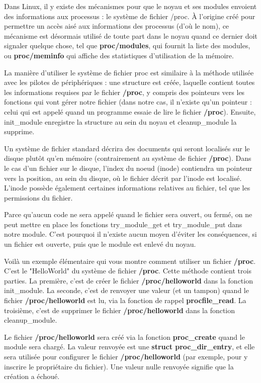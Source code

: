 \documentclass[11pt]{article}
\begin{document}
Dans Linux, il y existe des mécanismes pour que le noyau et ses modules envoient des informations aux processus : le système de fichier /proc. À l'origine créé pour permettre un accès aisé aux informations des processus (d'où le nom), ce mécanisme est désormais utilisé de toute part dans le noyau quand ce dernier doit signaler quelque chose, tel que \textbf{proc/modules}, qui fournit la liste des modules, ou \textbf{proc/meminfo} qui affiche des statistiques d'utilisation de la mémoire.

La manière d'utiliser le système de fichier proc est similaire à la méthode utilisée avec les pilotes de périphériques : une structure est créée, laquelle contient toutes les informations requises par le fichier \textbf{/proc}, y compris des pointeurs vers les fonctions qui vont gérer notre fichier (dans notre cas, il n'existe qu'un pointeur : celui qui est appelé quand un programme essaie de lire le fichier \textbf{/proc}). Ensuite, init\_module enregistre la structure au sein du noyau et cleanup\_module la supprime.

Un système de fichier standard décrira des documents qui seront localisés sur le disque plutôt qu'en mémoire (contrairement au système de fichier \textbf{/proc}).  Dans le cas d'un fichier sur le disque, l'index du noeud (inode) contiendra un pointeur vers la position, au sein du disque, où le fichier décrit par l'inode est localisé. L'inode possède également certaines informations relatives au fichier, tel que les permissions du fichier.

Parce qu'aucun code ne sera appelé quand le fichier sera ouvert, ou fermé, on ne peut mettre en place les fonctions try\_module\_get et try\_module\_put dans notre module. C'est pourquoi il n'existe aucun moyen d'éviter les conséquences, si un fichier est ouverte, puis que le module est enlevé du noyau.

Voilà un exemple élémentaire qui vous montre comment utiliser un fichier \textbf{/proc}. C'est le "HelloWorld" du système de fichier \textbf{/proc}. Cette méthode contient trois parties. La première, c'est de créer le fichier \textbf{/proc/helloworld} dans la fonction init\_module. La seconde, c'est de renvoyer une valeur (et un tampon) quand le fichier \textbf{/proc/helloworld} est lu, via la fonction de rappel \textbf{procfile\_read}. La troisième, c'est de supprimer le fichier \textbf{/proc/helloworld} dans la fonction cleanup\_module.

Le fichier \textbf{/proc/helloworld} sera créé via la fonction \textbf{proc\_create} quand le module sera chargé. La valeur renvoyée est une \textbf{struct proc\_dir\_entry}, et elle sera utilisée pour configurer le fichier \textbf{/proc/helloworld} (par exemple, pour y inscrire le propriétaire du fichier). Une valeur nulle renvoyée signifie que la création a échoué.
\end{document}
